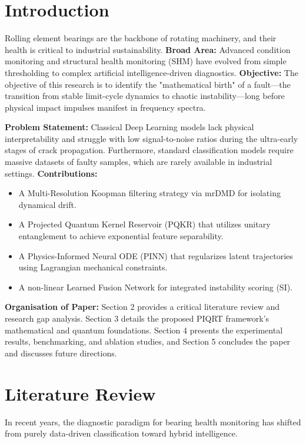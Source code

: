 \documentclass[a4paper,fleqn]{cas-dc}
\begin{document}
\maketitle

\section{Introduction}
Rolling element bearings are the backbone of rotating machinery, and their health is critical to industrial sustainability. \textbf{Broad Area:} Advanced condition monitoring and structural health monitoring (SHM) have evolved from simple thresholding to complex artificial intelligence-driven diagnostics. \textbf{Objective:} The objective of this research is to identify the "mathematical birth" of a fault—the transition from stable limit-cycle dynamics to chaotic instability—long before physical impact impulses manifest in frequency spectra. 

\textbf{Problem Statement:} Classical Deep Learning models lack physical interpretability and struggle with low signal-to-noise ratios during the ultra-early stages of crack propagation. Furthermore, standard classification models require massive datasets of faulty samples, which are rarely available in industrial settings. \textbf{Contributions:}
\begin{itemize}
    \item A Multi-Resolution Koopman filtering strategy via mrDMD for isolating dynamical drift.
    \item A Projected Quantum Kernel Reservoir (PQKR) that utilizes unitary entanglement to achieve exponential feature separability.
    \item A Physics-Informed Neural ODE (PINN) that regularizes latent trajectories using Lagrangian mechanical constraints.
    \item A non-linear Learned Fusion Network for integrated instability scoring (SI).
\end{itemize}

\textbf{Organisation of Paper:} Section 2 provides a critical literature review and research gap analysis. Section 3 details the proposed PIQRT framework's mathematical and quantum foundations. Section 4 presents the experimental results, benchmarking, and ablation studies, and Section 5 concludes the paper and discusses future directions.

\section{Literature Review}
In recent years, the diagnostic paradigm for bearing health monitoring has shifted from purely data-driven classification toward hybrid intelligence. 
\end{document}
